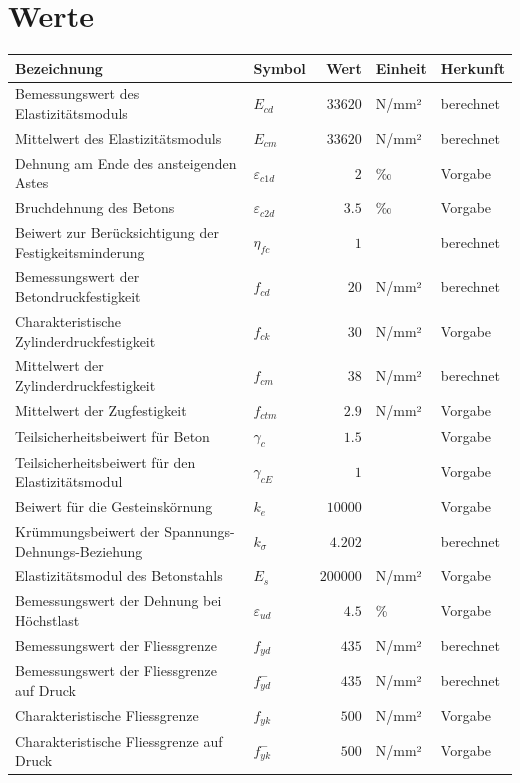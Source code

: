 \documentclass[11pt,a4paper]{article}
\begin{document}
\section{Werte}
\begin{xltabular}{\linewidth}{>{\raggedright\arraybackslash}Xlrll}
\hline
Bezeichnung & Symbol & Wert & Einheit & Herkunft \\
\hline
\endhead
Bemessungswert des Elastizitätsmoduls & $E_{cd}$ & $33620$ & N/mm² & berechnet \\
Mittelwert des Elastizitätsmoduls & $E_{cm}$ & $33620$ & N/mm² & berechnet \\
Dehnung am Ende des ansteigenden Astes & $\varepsilon_{c1d}$ & $2$ & ‰ & Vorgabe \\
Bruchdehnung des Betons & $\varepsilon_{c2d}$ & $3.5$ & ‰ & Vorgabe \\
Beiwert zur Berücksichtigung der Festigkeitsminderung & $\eta_{fc}$ & $1$ &  & berechnet \\
Bemessungswert der Betondruckfestigkeit & $f_{cd}$ & $20$ & N/mm² & berechnet \\
Charakteristische Zylinderdruckfestigkeit & $f_{ck}$ & $30$ & N/mm² & Vorgabe \\
Mittelwert der Zylinderdruckfestigkeit & $f_{cm}$ & $38$ & N/mm² & berechnet \\
Mittelwert der Zugfestigkeit & $f_{ctm}$ & $2.9$ & N/mm² & Vorgabe \\
Teilsicherheitsbeiwert für Beton & $\gamma_c$ & $1.5$ &  & Vorgabe \\
Teilsicherheitsbeiwert für den Elastizitätsmodul & $\gamma_{cE}$ & $1$ &  & Vorgabe \\
Beiwert für die Gesteinskörnung & $k_e$ & $10000$ &  & Vorgabe \\
Krümmungsbeiwert der Spannungs-Dehnungs-Beziehung & $k_{\sigma}$ & $4.202$ &  & berechnet \\
Elastizitätsmodul des Betonstahls & $E_s$ & $200000$ & N/mm² & Vorgabe \\
Bemessungswert der Dehnung bei Höchstlast & $\varepsilon_{ud}$ & $4.5$ & \% & Vorgabe \\
Bemessungswert der Fliessgrenze & $f_{yd}$ & $435$ & N/mm² & berechnet \\
Bemessungswert der Fliessgrenze auf Druck & $f_{yd}^{-}$ & $435$ & N/mm² & berechnet \\
Charakteristische Fliessgrenze & $f_{yk}$ & $500$ & N/mm² & Vorgabe \\
Charakteristische Fliessgrenze auf Druck & $f_{yk}^{-}$ & $500$ & N/mm² & Vorgabe \\

\end{xltabular}
\end{document}
